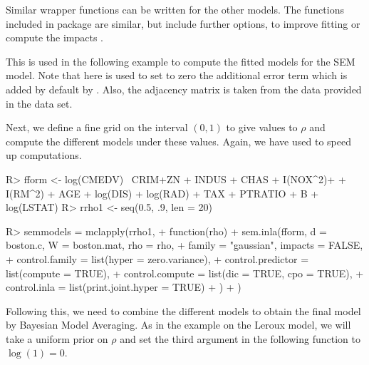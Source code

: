 \documentclass[article]{jss}
\begin{document}
Similar wrapper functions can be written for the other models. The functions
included in package  are similar, but include further options,
to improve fitting or compute the impacts 
\citep[see,][for details]{Bivandetal:2013}.

This is used in the following example to compute the fitted models
for the SEM model. Note that here  is used to set
to zero the additional error term which is added by default by .
Also, the adjacency matrix is taken from the data provided in the 
data set.

\begin{Schunk}
\end{Schunk}

Next, we define a fine grid on the interval $(0,1)$ to give values
to $\rho$ and compute the different models under these values. Again,
we have used   to speed up computations.


\begin{Schunk}
\begin{Sinput}
R> fform <- log(CMEDV) ~CRIM+ZN + INDUS + CHAS + I(NOX^2)+
+     I(RM^2) +  AGE + log(DIS) + log(RAD) + TAX + PTRATIO + B + log(LSTAT)
R> rrho1 <- seq(0.5, .9, len = 20)
\end{Sinput}
\end{Schunk}
\begin{Schunk}
\begin{Sinput}
R> semmodels = mclapply(rrho1,
+          function(rho) {
+                  sem.inla(fform, d = boston.c, W = boston.mat, rho = rho,
+                          family = "gaussian", impacts = FALSE,
+                          control.family = list(hyper = zero.variance),
+                          control.predictor = list(compute = TRUE),
+                          control.compute = list(dic = TRUE, cpo = TRUE),
+                          control.inla = list(print.joint.hyper = TRUE)
+                  )
+          })
\end{Sinput}
\end{Schunk}

\noindent
Following this, we need to combine the different models
to obtain the final model by Bayesian Model Averaging. As in the
example on the Leroux model, we will take
a uniform prior on $\rho$ and set the third argument in the following
function to $\log(1)=0$. 
\end{document}
